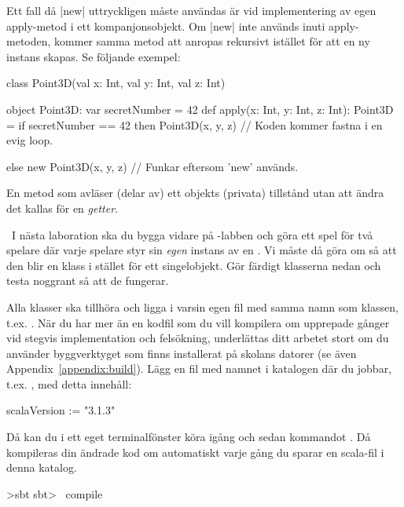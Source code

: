 Ett fall då \code|new| uttryckligen måste användas är vid implementering av egen apply-metod i ett kompanjonsobjekt. Om \code|new| inte används inuti apply-metoden, kommer samma metod att anropas rekursivt istället för att en ny instans skapas. Se följande exempel:

\begin{Code}
class Point3D(val x: Int, val y: Int, val z: Int)

object Point3D:
  var secretNumber = 42
  def apply(x: Int, y: Int, z: Int): Point3D =
    if secretNumber == 42 then
      Point3D(x, y, z) // Koden kommer fastna i en evig loop.

    else new Point3D(x, y, z) // Funkar eftersom 'new' används.
\end{Code}



\SubtaskSolved En metod som avläser (delar av) ett objekts (privata) tillstånd utan att ändra det kallas för en \emph{getter}.

\QUESTEND



\QUESTBEGIN

\Task\label{exe:classes:labprep}  \what~I nästa laboration ska du bygga vidare på -labben och göra ett spel för två spelare där varje spelare styr sin \emph{egen} instans av en . Vi måste då göra om  så att den blir en klass i stället för ett singelobjekt. Gör färdigt klasserna nedan och testa noggrant så att de fungerar. 

Alla klasser ska tillhöra  och ligga i varsin egen fil med samma namn som klassen, t.ex. . När du har mer än en kodfil som du vill kompilera om upprepade gånger vid stegvis implementation och felsökning, underlättas ditt arbetet stort om du använder byggverktyget  som finns installerat på skolans datorer (se även Appendix~\ref{appendix:build}). Lägg en fil med namnet  i katalogen där du jobbar, t.ex. , med detta innehåll:
\begin{Code}
scalaVersion := "3.1.3"
\end{Code}
Då kan du i ett eget terminalfönster köra igång  och sedan kommandot . Då kompileras din ändrade kod om automatiskt varje gång du sparar en scala-fil i denna katalog.
\begin{REPLnonum}
>sbt
sbt> ~compile
\end{REPLnonum}

